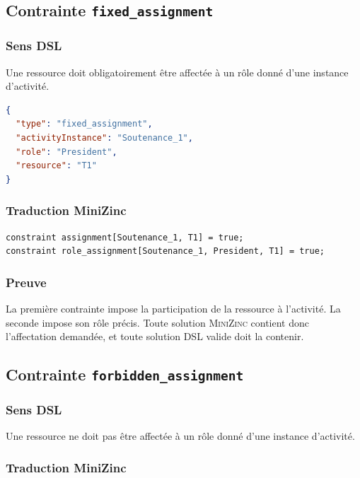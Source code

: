 \documentclass[12pt,a4paper]{article}
\newcommand{\MZN}{\textsc{MiniZinc}}
\begin{document}
\subsection{Contrainte \texttt{fixed\_assignment}}

\subsubsection*{Sens DSL}

Une ressource doit obligatoirement être affectée à un rôle donné d'une instance d'activité.

\begin{lstlisting}[language=JSON]
{
  "type": "fixed_assignment",
  "activityInstance": "Soutenance_1",
  "role": "President",
  "resource": "T1"
}
\end{lstlisting}

\subsubsection*{Traduction MiniZinc}

\begin{lstlisting}[language=MiniZinc]
constraint assignment[Soutenance_1, T1] = true;
constraint role_assignment[Soutenance_1, President, T1] = true;
\end{lstlisting}

\subsubsection*{Preuve}

La première contrainte impose la participation de la ressource à l'activité. La seconde impose son rôle précis. Toute solution \MZN{} contient donc l'affectation demandée, et toute solution DSL valide doit la contenir.

\subsection{Contrainte \texttt{forbidden\_assignment}}

\subsubsection*{Sens DSL}

Une ressource ne doit pas être affectée à un rôle donné d'une instance d'activité.

\subsubsection*{Traduction MiniZinc}
\end{document}

